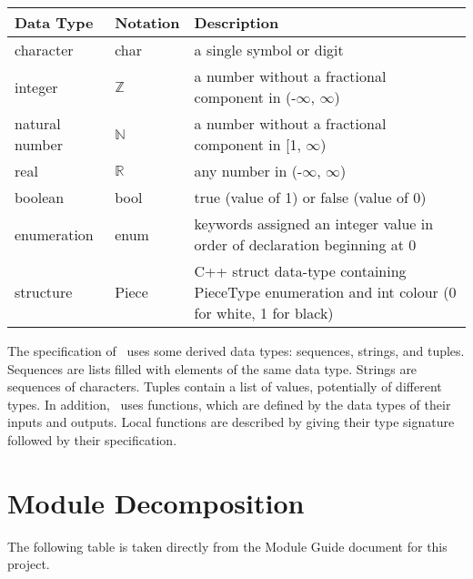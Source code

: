 \documentclass[12pt, titlepage]{article}
\begin{document}
\begin{center}
\renewcommand{\arraystretch}{1.2}
\noindent 
\begin{tabular}{l l p{7.5cm}} 
\toprule 
\textbf{Data Type} & \textbf{Notation} & \textbf{Description}\\ 
\midrule
character & char & a single symbol or digit\\
integer & $\mathbb{Z}$ & a number without a fractional component in (-$\infty$, $\infty$) \\
natural number & $\mathbb{N}$ & a number without a fractional component in [1, $\infty$) \\
real & $\mathbb{R}$ & any number in (-$\infty$, $\infty$)\\
boolean & bool & true (value of 1) or false (value of 0)\\
enumeration & enum & keywords assigned an integer value in order of declaration beginning at 0\\
structure & Piece & C++ struct data-type containing PieceType enumeration and int colour (0 for white, 1 for black)\\
\bottomrule
\end{tabular} 
\end{center}

\noindent
The specification of \progname \ uses some derived data types: sequences, strings, and
tuples. Sequences are lists filled with elements of the same data type. Strings
are sequences of characters. Tuples contain a list of values, potentially of
different types. In addition, \progname \ uses functions, which
are defined by the data types of their inputs and outputs. Local functions are
described by giving their type signature followed by their specification.

\section{Module Decomposition}

The following table is taken directly from the Module Guide document for this project.
\end{document}
